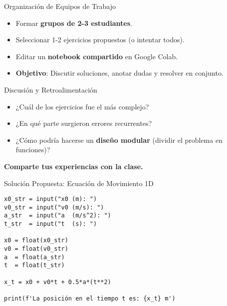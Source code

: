 \documentclass[10pt]{beamer}
\begin{document}
\begin{frame}{Organización de Equipos de Trabajo}
  \begin{itemize}
    \item Formar \textbf{grupos de 2-3 estudiantes}.
    \item Seleccionar 1-2 ejercicios propuestos (o intentar todos).
    \item Editar un \textbf{notebook compartido} en Google Colab.
    \item \textbf{Objetivo}: Discutir soluciones, anotar dudas y resolver en conjunto.
  \end{itemize}
\end{frame}

\begin{frame}{Discusión y Retroalimentación}
  \begin{itemize}
    \item ¿Cuál de los ejercicios fue el más complejo?
    \item ¿En qué parte surgieron errores recurrentes?
    \item ¿Cómo podría hacerse un \textbf{diseño modular} (dividir el problema en funciones)?
  \end{itemize}
  \vspace{0.2cm}
  \textbf{Comparte tus experiencias con la clase.}
\end{frame}

\begin{frame}[fragile]{Solución Propuesta: Ecuación de Movimiento 1D}
\begin{verbatim}
x0_str = input("x0 (m): ")
v0_str = input("v0 (m/s): ")
a_str  = input("a  (m/s^2): ")
t_str  = input("t  (s): ")

x0 = float(x0_str)
v0 = float(v0_str)
a  = float(a_str)
t  = float(t_str)

x_t = x0 + v0*t + 0.5*a*(t**2)

print(f'La posición en el tiempo t es: {x_t} m')
\end{verbatim}
\end{frame}
\end{document}
